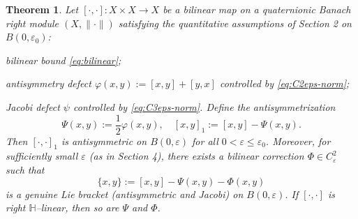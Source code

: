 \documentclass[10pt]{amsart}
\numberwithin{equation}{section}
\newtheorem{thm}[theorem]{Theorem}
\theoremstyle{remark}
\theoremstyle{definition}
\begin{document}
\begin{thm}\label{thm:rigidification-full}
Let $[\cdot, \cdot]: X \times X \to X$ be a bilinear map on a quaternionic Banach right module $(X, \|\cdot\|)$ satisfying the quantitative assumptions of Section 2 on $B(0, \varepsilon_0)$:
\item bilinear bound \eqref{eq:bilinear};
    \item antisymmetry defect $\varphi(x, y) := [x, y] + [y, x]$ controlled by \eqref{eq:C2eps-norm};
    \item Jacobi defect $\psi$ controlled by \eqref{eq:C3eps-norm}.
Define the antisymmetrization
\[
\Psi(x, y) := \frac{1}{2} \varphi(x, y), \quad [x, y]_1 := [x, y] - \Psi(x, y).
\]
Then $[\cdot, \cdot]_1$ is antisymmetric on $B(0, \varepsilon)$ for all $0 < \varepsilon \leq \varepsilon_0$. Moreover, for sufficiently small $\varepsilon$ (as in Section 4), there exists a bilinear correction $\Phi \in C_\varepsilon^2$ such that
\[
\{x, y\} := [x, y] - \Psi(x, y) - \Phi(x, y)
\]
is a genuine Lie bracket (antisymmetric and Jacobi) on $B(0, \varepsilon)$. If $[\cdot, \cdot]$ is right $\mathbb{H}$--linear, then so are $\Psi$ and $\Phi$.
\end{thm}
\end{document}
